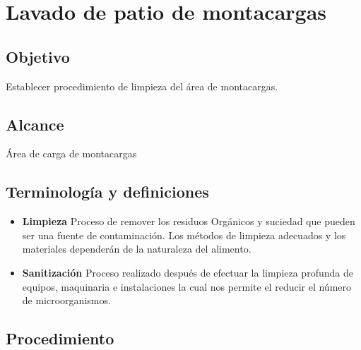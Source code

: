 \renewcommand{\MenorVer}{0}
\renewcommand{\MayorVer}{2}
\renewcommand{\Codigo}{HYS-11-IT}
\renewcommand{\FechaPub}{2023--01}
\renewcommand{\Titulo}{Lavado de patio de montacargas}

\section{\Titulo}

\subsection{Objetivo}
Establecer procedimiento de limpieza del área de montacargas.

\subsection{Alcance}
Área de carga de montacargas

\subsection{Terminología y definiciones}
\begin{itemize}
	\item \textbf{Limpieza} Proceso de remover los residuos Orgánicos y suciedad que pueden ser una fuente de contaminación. Los métodos de limpieza adecuados y los materiales dependerán de la naturaleza del alimento.
	\item \textbf{Sanitización} Proceso realizado después de efectuar la limpieza profunda de equipos, maquinaria e instalaciones la cual nos permite el reducir el número de microorganismos.
\end{itemize}



\subsection{Procedimiento}

